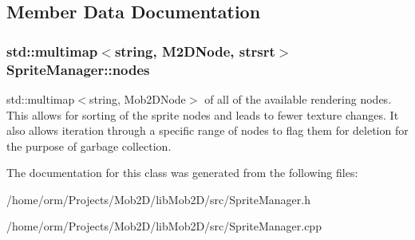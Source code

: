 \subsection{Member Data Documentation}
\hypertarget{classSpriteManager_a5156a8aad404a5c7f6b14183f1dd178b}{
\subsubsection[{nodes}]{\setlength{\rightskip}{0pt plus 5cm}std::multimap$<$string, M2DNode, {\bf strsrt}$>$ {\bf SpriteManager::nodes}}}
\label{classSpriteManager_a5156a8aad404a5c7f6b14183f1dd178b}
std::multimap$<$string, Mob2DNode$>$ of all of the available rendering nodes. This allows for sorting of the sprite nodes and leads to fewer texture changes. It also allows iteration through a specific range of nodes to flag them for deletion for the purpose of garbage collection. 

The documentation for this class was generated from the following files:\begin{DoxyCompactItemize}
\item 
/home/orm/Projects/Mob2D/libMob2D/src/SpriteManager.h\item 
/home/orm/Projects/Mob2D/libMob2D/src/SpriteManager.cpp\end{DoxyCompactItemize}
